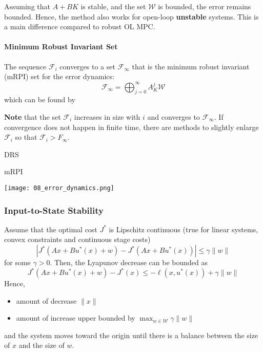 Assuming that $A+BK$ is stable, and the set $\mathcal{W}$ is bounded, the error remains bounded. Hence, the method also works for open-loop \textbf{unstable} systems. This is a main difference compared to robust OL MPC.

\paragraph{Minimum Robust Invariant Set}

The sequence $\mathcal{F}_i$ converges to a set $\mathcal{F}_\infty$ that is the minimum robust invariant (mRPI) set for the error dynamics:
\begin{equation*}
    \mathcal{F}_\infty = \bigoplus_{j=0}^{\infty}A_{K}^{j}\mathcal{W}
\end{equation*}
which can be found by
\noindent{}

\textbf{Note} that the set $\mathcal{F}_i$ increases in size with $i$ and converges to $\mathcal{F}_\infty$. If convergence does not happen in finite time, there are methods to slightly enlarge $\mathcal{F}_i$ so that $\mathcal{F}_i>F_\infty$.

\begin{minipage}[t]{0.5\linewidth}
    \centering
    DRS
\end{minipage}
\begin{minipage}[t]{0.5\linewidth}
    \centering
    mRPI
\end{minipage}
\begin{center}
    \texttt{[image: 08\_error\_dynamics.png]}
\end{center}

\subsubsection{Input-to-State Stability}
Assume that the optimal cost $J^*$ is Lipschitz continuous (true for linear systems, convex constraints and continuous stage costs)
\begin{equation*}
    |J^*(A x + B u^*(x) + w) - J^*(A x + B u^*(x))| \leq \gamma \|w\|
\end{equation*}
for some $\gamma > 0$.
\newpar{}
Then, the Lyapunov decrease can be bounded as
\begin{equation*}
    J^*(A x + B u^*(x) + w) - J^*(x)\leq -\ell(x, u^*(x)) + \gamma \|w\|
\end{equation*}
Hence,
\begin{itemize}
    \item amount of decrease $\|x\|$
    \item amount of increase upper bounded by $\max_{w \in \mathcal{W}} \gamma \|w\|$
\end{itemize}
and the system moves toward the origin until there is a balance between the size of $x$ and the size of $w$.

